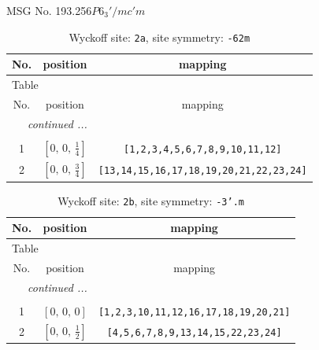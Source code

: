 \documentclass[fleqn,8pt]{jsarticle}
\begin{document}
\setcounter{MaxMatrixCols}{32}

\renewcommand{\tablename}{Table~}
\renewcommand{\figurename}{Figure~}
\begin{center}
\LARGE
MSG No. 193.256\quad$P6_{3}'/mc'm$
\end{center}
\renewcommand{\arraystretch}{1.2}
\begin{longtable}{ccc}
\caption{Wyckoff site: {\tt 2a}, site symmetry: {\tt -62m}}
 \\
 \hline \hline
No. & position & mapping \\ \hline \endfirsthead

\multicolumn{2}{l}{\tablename\ \thetable{}} \\
 \hline \hline
No. & position & mapping \\ \hline \endhead

 \hline \hline
\multicolumn{2}{r}{\footnotesize\it continued ...} \\ \endfoot

 \hline \hline
\multicolumn{2}{r}{} \\ \endlastfoot

1 & $\left[ 0,\, 0,\, \frac{1}{4} \right]$ & {\tt [1,2,3,4,5,6,7,8,9,10,11,12]} \\ \hline
2 & $\left[ 0,\, 0,\, \frac{3}{4} \right]$ & {\tt [13,14,15,16,17,18,19,20,21,22,23,24]} \\
\end{longtable}
\renewcommand{\arraystretch}{1.2}
\begin{longtable}{ccc}
\caption{Wyckoff site: {\tt 2b}, site symmetry: {\tt -3'.m}}
 \\
 \hline \hline
No. & position & mapping \\ \hline \endfirsthead

\multicolumn{2}{l}{\tablename\ \thetable{}} \\
 \hline \hline
No. & position & mapping \\ \hline \endhead

 \hline \hline
\multicolumn{2}{r}{\footnotesize\it continued ...} \\ \endfoot

 \hline \hline
\multicolumn{2}{r}{} \\ \endlastfoot

1 & $\left[ 0,\, 0,\, 0 \right]$ & {\tt [1,2,3,10,11,12,16,17,18,19,20,21]} \\ \hline
2 & $\left[ 0,\, 0,\, \frac{1}{2} \right]$ & {\tt [4,5,6,7,8,9,13,14,15,22,23,24]} \\
\end{longtable}
\end{document}
